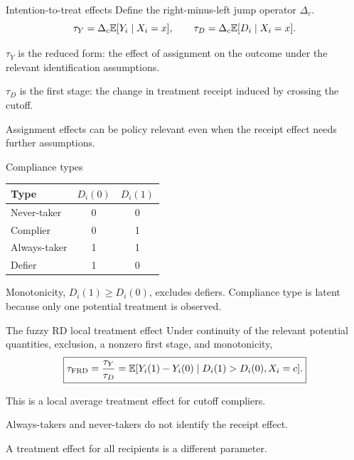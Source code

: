 \begin{frame}{Intention-to-treat effects}
Define the right-minus-left jump operator $\Delta_c$.
\[
\tau_Y=\Delta_c\mathbb{E}[Y_i\mid X_i=x],\qquad
\tau_D=\Delta_c\mathbb{E}[D_i\mid X_i=x].
\]
\begin{items}
\item $\tau_Y$ is the reduced form: the effect of assignment on the outcome under the relevant identification assumptions.
\item $\tau_D$ is the first stage: the change in treatment receipt induced by crossing the cutoff.
\item Assignment effects can be policy relevant even when the receipt effect needs further assumptions.
\end{items}
\end{frame}

\begin{frame}{Compliance types}
\begin{center}\renewcommand{\arraystretch}{1.5}
\begin{tabular}{@{}lcc@{}}\toprule
Type & $D_i(0)$ & $D_i(1)$\\\midrule
Never-taker & 0 & 0\\
Complier & 0 & 1\\
Always-taker & 1 & 1\\
Defier & 1 & 0\\\bottomrule
\end{tabular}\end{center}
Monotonicity, $D_i(1)\geq D_i(0)$, excludes defiers. Compliance type is latent because only one potential treatment is observed.
\end{frame}

\begin{frame}{The fuzzy RD local treatment effect}
Under continuity of the relevant potential quantities, exclusion, a nonzero first stage, and monotonicity,
\[
\boxed{\tau_{\mathrm{FRD}}=\frac{\tau_Y}{\tau_D}
=\mathbb{E}[Y_i(1)-Y_i(0)\mid D_i(1)>D_i(0),X_i=c].}
\]
\begin{items}
\item This is a local average treatment effect for cutoff compliers.
\item Always-takers and never-takers do not identify the receipt effect.
\item A treatment effect for all recipients is a different parameter.
\end{items}
\end{frame}

